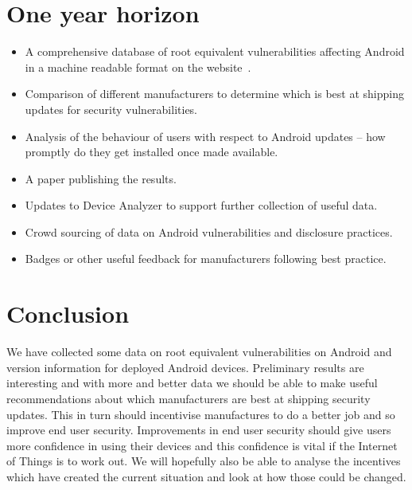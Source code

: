 \documentclass[a4paper,twocolumn]{article}
\begin{document}
\section*{One year horizon}
\begin{itemize}
 \item A comprehensive database of root equivalent vulnerabilities affecting Android in a machine readable format on the website~\cite{androidvulnerabilities.org}.
 \item Comparison of different manufacturers to determine which is best at shipping updates for security vulnerabilities.
 \item Analysis of the behaviour of users with respect to Android updates -- how promptly do they get installed once made available.
 \item A paper publishing the results.
 \item Updates to Device Analyzer to support further collection of useful data.
 \item Crowd sourcing of data on Android vulnerabilities and disclosure practices.
 \item Badges or other useful feedback for manufacturers following best practice.
\end{itemize}


\section*{Conclusion}
We have collected some data on root equivalent vulnerabilities on Android and version information for deployed Android devices.
Preliminary results are interesting and with more and better data we should be able to make useful recommendations about which manufacturers are best at shipping security updates.
This in turn should incentivise manufactures to do a better job and so improve end user security.
Improvements in end user security should give users more confidence in using their devices and this confidence is vital if the Internet of Things is to work out.
We will hopefully also be able to analyse the incentives which have created the current situation and look at how those could be changed.


\printbibliography
\end{document}
